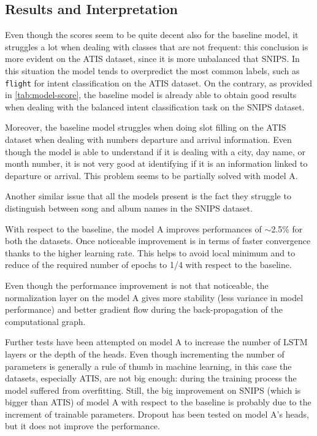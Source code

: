 \documentclass[a4paper]{article}
\begin{document}
\subsection{Results and Interpretation}
Even though the scores seem to be quite decent also for the baseline model, it struggles a lot when dealing with classes that are not frequent: this conclusion is more evident on the ATIS dataset, since it is more unbalanced that SNIPS. In this situation the model tends to overpredict the most common labels, such as \texttt{flight} for intent classification on the ATIS dataset. On the contrary, as provided in \cref{tab:model-score}, the baseline model is already able to obtain good results when dealing with the balanced intent classification task on the SNIPS dataset. 

Moreover, the baseline model struggles when doing slot filling on the ATIS dataset when dealing with numbers departure and arrival information. Even though the model is able to understand if it is dealing with a city, day name, or month number, it is not very good at identifying if it is an information linked to departure or arrival. This problem seems to be partially solved with model A.

Another similar issue that all the models present is the fact they struggle to distinguish between song and album names in the SNIPS dataset.

With respect to the baseline, the model A improves performances of $\sim$2.5\% for both the datasets. Once noticeable improvement is in terms of faster convergence thanks to the higher learning rate. This helps to avoid local minimum and to reduce of the required number of epochs to 1/4 with respect to the baseline.

Even though the performance improvement is not that noticeable, the normalization layer on the model A gives more stability (less variance in model performance) and better gradient flow during the back-propagation of the computational graph.

Further tests have been attempted on model A to increase the number of LSTM layers or the depth of the heads. Even though incrementing the number of parameters is generally a rule of thumb in machine learning, in this case the datasets, especially ATIS, are not big enough: during the training process the model suffered from overfitting. Still, the big improvement on SNIPS (which is bigger than ATIS) of model A with respect to the baseline is probably due to the increment of trainable parameters. Dropout has been tested on model A's heads, but it does not improve the performance.
\end{document}
